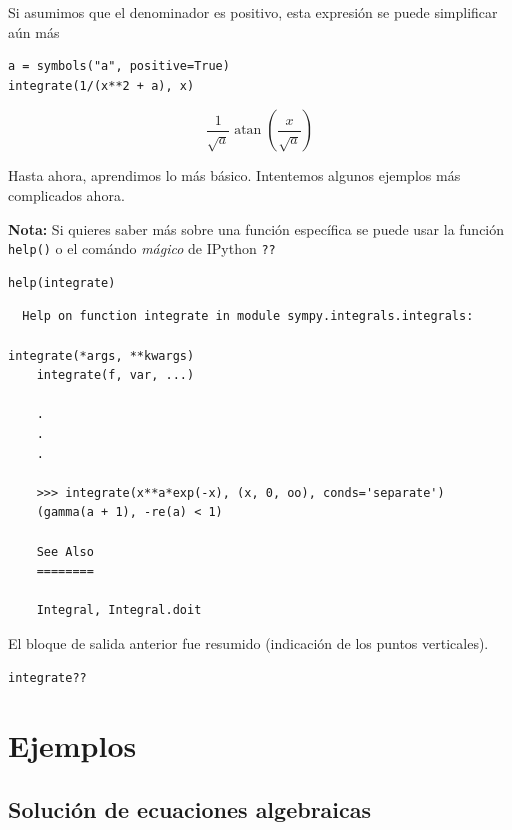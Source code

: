 Si asumimos que el denominador es positivo, esta expresión se puede
simplificar aún más

\begin{listing}[H]
\begin{verbatim}
a = symbols("a", positive=True)
integrate(1/(x**2 + a), x)
\end{verbatim}
\end{listing}

\[\frac{1}{\sqrt{a}} \operatorname{atan}{\left (\frac{x}{\sqrt{a}} \right )}\]

Hasta ahora, aprendimos lo más básico. Intentemos algunos ejemplos más
complicados ahora.

\textbf{Nota:} Si quieres saber más sobre una función específica se
puede usar la función \texttt{help()} o el comándo \emph{mágico} de
IPython \texttt{??}

\begin{listing}[H]
\begin{verbatim}
help(integrate)
\end{verbatim}
\end{listing}

\begin{verbatim}
  Help on function integrate in module sympy.integrals.integrals:

integrate(*args, **kwargs)
    integrate(f, var, ...)
    
    .
    .
    .
    
    >>> integrate(x**a*exp(-x), (x, 0, oo), conds='separate')
    (gamma(a + 1), -re(a) < 1)
    
    See Also
    ========
    
    Integral, Integral.doit
\end{verbatim}

El bloque de salida anterior fue resumido (indicación de los puntos verticales).

\begin{listing}[H]
\begin{verbatim}
integrate??
\end{verbatim}
\end{listing}

\section{Ejemplos}

\hypertarget{soluciuxf3n-de-ecuaciones-algebraicas}{%
\subsection{Solución de ecuaciones
algebraicas}\label{soluciuxf3n-de-ecuaciones-algebraicas}}

